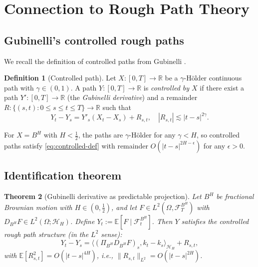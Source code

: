 \documentclass[11pt,a4paper]{article}
\theoremstyle{plain}
\newtheorem{theorem}{Theorem}[section]
\theoremstyle{definition}
\newtheorem{definition}[theorem]{Definition}
\theoremstyle{remark}
\newcommand{\R}{\mathbb{R}}
\newcommand{\E}{\mathbb{E}}
\newcommand{\ip}[2]{\langle #1, #2 \rangle}
\newcommand{\Lp}[1]{L^{#1}}
\newcommand{\Ft}{\mathcal{F}_t}
\newcommand{\FT}{\mathcal{F}_T}
\newcommand{\HH}{\mathcal{H}_H}
\begin{document}
\section{Connection to Rough Path Theory}\label{sec:rough-path}

\subsection{Gubinelli's controlled rough paths}

We recall the definition of controlled paths from Gubinelli \cite{Gubinelli04}.

\begin{definition}[Controlled path]\label{def:controlled}
Let $X : [0, T] \to \R$ be a $\gamma$-H\"older continuous path with $\gamma \in (0, 1)$. A path $Y : [0, T] \to \R$ is \emph{controlled by $X$} if there exist a path $Y' : [0, T] \to \R$ (the \emph{Gubinelli derivative}) and a remainder $R : \{(s,t) : 0 \leq s \leq t \leq T\} \to \R$ such that
\begin{equation}\label{eq:controlled-def}
Y_t - Y_s = Y'_s(X_t - X_s) + R_{s,t}, \quad |R_{s,t}| \lesssim |t - s|^{2\gamma}.
\end{equation}
\end{definition}

For $X = B^H$ with $H < \frac{1}{2}$, the paths are $\gamma$-H\"older for any $\gamma < H$, so controlled paths satisfy \eqref{eq:controlled-def} with remainder $O(|t - s|^{2H-\epsilon})$ for any $\epsilon > 0$.

\subsection{Identification theorem}

\begin{theorem}[Gubinelli derivative as predictable projection]\label{thm:gubinelli-identification}
Let $B^H$ be fractional Brownian motion with $H \in (0, \frac{1}{2})$, and let $F \in \Lp{2}(\Omega, \FT^{B^H})$ with $D_{B^H} F \in \Lp{2}(\Omega; \HH)$. Define $Y_t := \E[F \mid \Ft^{B^H}]$. Then $Y$ satisfies the controlled rough path structure (in the $\Lp{2}$ sense):
\begin{equation}\label{eq:gubinelli-structure}
Y_t - Y_s = \ip{(\Pi_{B^H} D_{B^H} F)_s}{k_t - k_s}_{\HH} + R_{s,t},
\end{equation}
with $\E[R_{s,t}^2] = O(|t-s|^{4H})$, i.e., $\|R_{s,t}\|_{L^2} = O(|t-s|^{2H})$.
\end{theorem}
\end{document}
